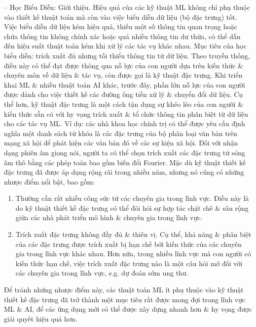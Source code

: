 \documentclass{article}
\begin{document}
\begin{itemize}
\begin{itemize}
        -- {\sf Học Biểu Diễn: Giới thiệu.} Hiệu quả của các kỹ thuật ML không chỉ phụ thuộc vào thiết kế thuật toán mà còn vào việc biểu diễn dữ liệu (bộ đặc trưng) tốt. Việc biểu diễn dữ liệu kém hiệu quả, thiếu một số thông tin quan trọng hoặc chứa thông tin không chính xác hoặc quá nhiều thông tin dư thừa, có thể dẫn đến hiệu suất thuật toán kém khi xử lý các tác vụ khác nhau. Mục tiêu của học biểu diễn: trích xuất đủ nhưng tối thiểu thông tin từ dữ liệu. Theo truyền thống, điều này có thể đạt được thông qua nỗ lực của con người dựa trên kiến thức \& chuyên môn về dữ liệu \& tác vụ, còn được gọi là kỹ thuật đặc trưng. Khi triển khai ML \& nhiều thuật toán AI khác, trước đây, phần lớn nỗ lực của con người được dành cho việc thiết kế các đường ống tiền xử lý \& chuyển đổi dữ liệu. Cụ thể hơn, kỹ thuật đặc trưng là một cách tận dụng sự khéo léo của con người \& kiến thức sẵn có với hy vọng trích xuất \& tổ chức thông tin phân biệt từ dữ liệu cho các tác vụ ML. Ví dụ: các nhà khoa học chính trị có thể được yêu cầu định nghĩa một danh sách từ khóa là các đặc trưng của bộ phân loại văn bản trên mạng xã hội để phát hiện các văn bản đó về các sự kiện xã hội. Đối với nhận dạng phiên âm giọng nói, người ta có thể chọn trích xuất các đặc trưng từ sóng âm thô bằng các phép toán bao gồm biến đổi Fourier. Mặc dù kỹ thuật thiết kế đặc trưng đã được áp dụng rộng rãi trong nhiều năm, nhưng nó cũng có những nhược điểm nổi bật, bao gồm:
        \begin{enumerate}
            \item Thường cần rất nhiều công sức từ các chuyên gia trong lĩnh vực. Điều này là do kỹ thuật thiết kế đặc trưng có thể đòi hỏi sự hợp tác chặt chẽ \& sâu rộng giữa các nhà phát triển mô hình \& chuyên gia trong lĩnh vực.
            \item Trích xuất đặc trưng không đầy đủ \& thiên vị. Cụ thể, khả năng \& phân biệt của các đặc trưng được trích xuất bị hạn chế bởi kiến thức của các chuyên gia trong lĩnh vực khác nhau. Hơn nữa, trong nhiều lĩnh vực mà con người có kiến thức hạn chế, việc trích xuất đặc trưng nào là một câu hỏi mở đối với các chuyên gia trong lĩnh vực, e.g. dự đoán sớm ung thư.
        \end{enumerate}
        Để tránh những nhược điểm này, các thuật toán ML ít phụ thuộc vào kỹ thuật thiết kế đặc trưng đã trở thành một mục tiêu rất được mong đợi trong lĩnh vực ML \& AI, để các ứng dụng mới có thể được xây dựng nhanh hơn \& hy vọng được giải quyết hiệu quả hơn.


\end{itemize}
\end{itemize}
\end{document}
